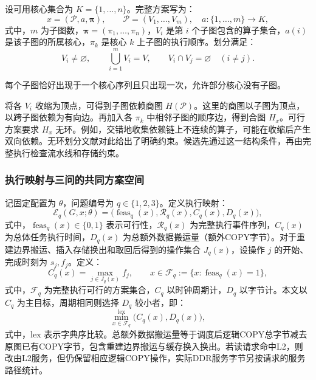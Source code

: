 设可用核心集合为 $K=\{1,\ldots,n\}$。完整方案写为：
\begin{equation}
 x=(\mathcal P,a,\boldsymbol\pi),\qquad
 \mathcal P=(V_1,\ldots,V_m),\quad a:\{1,\ldots,m\}\longrightarrow K ,
 \label{eq:plan}
\end{equation}
\noindent 式中，$m$ 为子图数，$\boldsymbol\pi=(\pi_1,\ldots,\pi_n)$，$V_i$ 是第 $i$ 个子图包含的算子集合，$a(i)$ 是该子图的所属核心，$\pi_k$ 是核心 $k$ 上子图的执行顺序。划分满足：
\begin{equation}
 V_i\ne\varnothing,\qquad \bigcup_{i=1}^{m}V_i=V,\qquad
 V_i\cap V_j=\varnothing\quad(i\ne j).
 \label{eq:partition}
\end{equation}

每个子图恰好出现于一个核心序列且只出现一次，允许部分核心没有子图。

将各 $V_i$ 收缩为顶点，可得到子图依赖商图 $H(\mathcal P)$。这里的商图以子图为顶点，以跨子图依赖为有向边。再加入各 $\pi_k$ 中相邻子图的顺序边，得到合图 $H_x$。可行方案要求 $H_x$ 无环。例如，交错地收集依赖链上不连续的算子，可能在收缩后产生双向依赖。无环划分文献对此给出了明确约束\cite{A02}。候选先通过这一结构条件，再由完整执行检查流水线和存储约束。

\subsubsection{执行映射与三问的共同方案空间}
记固定配置为 $\theta$，问题编号为 $q\in\{1,2,3\}$。定义执行映射：
\begin{equation}
 \mathcal E_q(G,x;\theta)
 =\bigl(\operatorname{feas}_q(x),\mathcal R_q(x),C_q(x),D_q(x)\bigr),
 \label{eq:evaluator}
\end{equation}
\noindent 式中，$\operatorname{feas}_q(x)\in\{0,1\}$ 表示可行性，$\mathcal R_q(x)$ 为完整执行事件序列，$C_q(x)$ 为总体任务执行时间，$D_q(x)$ 为总额外数据搬运量（额外COPY字节）。对于重建边界搬运、插入存储换出和取回后得到的操作集合 $J_q(x)$，设操作 $j$ 的开始、完成时刻为 $s_j,f_j$。定义：
\begin{equation}
 C_q(x)=\max_{j\in J_q(x)} f_j,
 \qquad x\in\mathcal F_q:=\{x:\operatorname{feas}_q(x)=1\},
 \label{eq:makespan}
\end{equation}
\noindent 式中，$\mathcal F_q$ 为完整执行可行的方案集合，$C_q$ 以时钟周期计，$D_q$ 以字节计。本文以 $C_q$ 为主目标，周期相同则选择 $D_q$ 较小者，即：
\begin{equation}
 \min_{x\in\mathcal F_q}^{\mathrm{lex}}\bigl(C_q(x),D_q(x)\bigr),
 \label{eq:objective}
\end{equation}
\noindent 式中，$\mathrm{lex}$ 表示字典序比较。总额外数据搬运量等于调度后逻辑COPY总字节减去原图已有COPY字节，包含重建边界搬运与缓存换入换出。若读请求命中L2，则改由L2服务，但仍保留相应逻辑COPY操作，实际DDR服务字节另按请求的服务路径统计。

